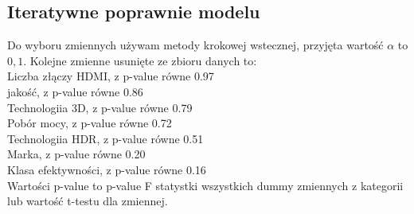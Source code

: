 \documentclass[11pt,a4paper]{article}
\begin{document}
 
	
	\subsection{Iteratywne poprawnie modelu}
		Do wyboru zmiennych używam metody krokowej wstecznej, przyjęta wartość $\alpha$ to $0,1$. Kolejne zmienne usunięte ze zbioru danych to:\\
		Liczba złączy HDMI, z p-value równe 0.97\\
		jakość, z p-value równe 0.86\\
		Technologiia 3D, z p-value równe 0.79\\
		Pobór mocy, z p-value równe 0.72\\
		Technologiia HDR, z p-value równe 0.51\\
		Marka, z p-value równe 0.20\\
		Klasa efektywności, z p-value równe 0.16\\
		Wartości p-value to p-value F statystki wszystkich dummy zmiennych z kategorii lub wartość t-testu dla zmiennej. \\
		
\end{document}
